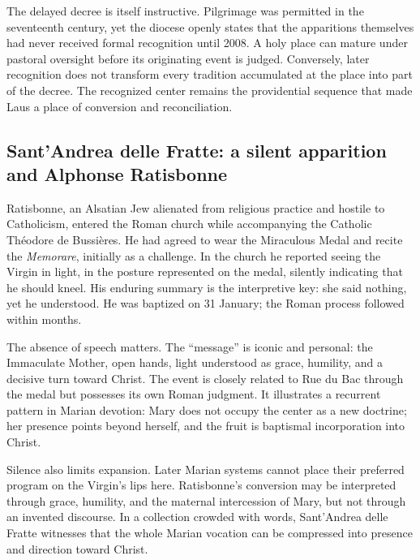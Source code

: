 The delayed decree is itself instructive. Pilgrimage was permitted in the seventeenth century, yet the diocese openly states that the apparitions themselves had never received formal recognition until 2008. A holy place can mature under pastoral oversight before its originating event is judged. Conversely, later recognition does not transform every tradition accumulated at the place into part of the decree. The recognized center remains the providential sequence that made Laus a place of conversion and reconciliation.

\subsection{Sant'Andrea delle Fratte: a silent apparition and Alphonse Ratisbonne}


Ratisbonne, an Alsatian Jew alienated from religious practice and hostile to Catholicism, entered the Roman church while accompanying the Catholic Théodore de Bussières. He had agreed to wear the Miraculous Medal and recite the \emph{Memorare}, initially as a challenge. In the church he reported seeing the Virgin in light, in the posture represented on the medal, silently indicating that he should kneel. His enduring summary is the interpretive key: she said nothing, yet he understood. He was baptized on 31 January; the Roman process followed within months.

The absence of speech matters. The ``message'' is iconic and personal: the Immaculate Mother, open hands, light understood as grace, humility, and a decisive turn toward Christ. The event is closely related to Rue du Bac through the medal but possesses its own Roman judgment. It illustrates a recurrent pattern in Marian devotion: Mary does not occupy the center as a new doctrine; her presence points beyond herself, and the fruit is baptismal incorporation into Christ.

Silence also limits expansion. Later Marian systems cannot place their preferred program on the Virgin's lips here. Ratisbonne's conversion may be interpreted through grace, humility, and the maternal intercession of Mary, but not through an invented discourse. In a collection crowded with words, Sant'Andrea delle Fratte witnesses that the whole Marian vocation can be compressed into presence and direction toward Christ.

